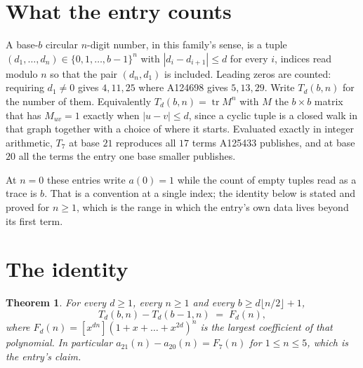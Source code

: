 \documentclass[11pt,a4paper]{article}
\theoremstyle{plain}
\newtheorem{theorem}{Theorem}
\theoremstyle{definition}
\begin{document}
\section{What the entry counts}

A base-$b$ circular $n$-digit number, in this family's sense, is a tuple
$(d_1,\dots,d_n)\in\{0,1,\dots,b-1\}^{n}$ with $|d_i-d_{i+1}|\le d$ for every $i$, indices
read modulo $n$ so that the pair $(d_n,d_1)$ is included. Leading zeros are counted: requiring
$d_1\ne0$ gives $4,11,25$ where A124698 gives $5,13,29$. Write $T_d(b,n)$ for the number of
them. Equivalently $T_d(b,n)=\operatorname{tr}M^{n}$ with $M$ the $b\times b$ matrix that has
$M_{uv}=1$ exactly when $|u-v|\le d$, since a cyclic tuple is a closed walk in that graph
together with a choice of where it starts. Evaluated exactly in integer arithmetic, $T_{7}$
at base $21$ reproduces all $17$ terms A125433 publishes, and at base $20$ all the
terms the entry one base smaller publishes.

At $n=0$ these entries write $a(0)=1$ while the count of empty tuples read as a trace is $b$.
That is a convention at a single index; the identity below is stated and proved for $n\ge1$,
which is the range in which the entry's own data lives beyond its first term.

\section{The identity}

\begin{theorem}
For every $d\ge1$, every $n\ge1$ and every $b\ge d\lfloor n/2\rfloor+1$,
\[
T_d(b,n)-T_d(b-1,n)\;=\;F_d(n),
\]
where $F_d(n)=[x^{dn}](1+x+\dots+x^{2d})^{n}$ is the largest coefficient of that
polynomial. In particular $a_{21}(n)-a_{20}(n)=F_{7}(n)$ for $1\le n\le5$, which
is the entry's claim.
\end{theorem}
\end{document}
